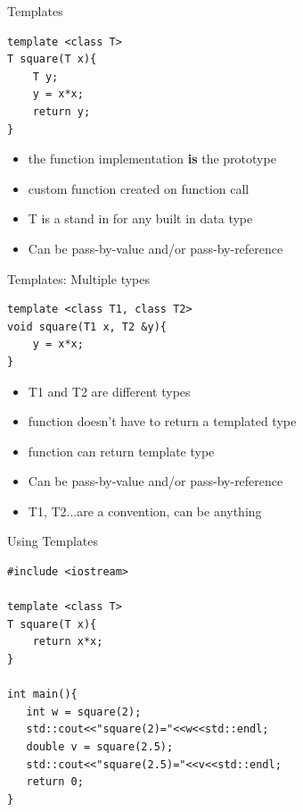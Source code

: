 \documentclass[xcolor={dvipsnames}]{beamer}
\begin{document}
\begin{frame}[fragile]{Templates}
	\begin{center} 
	\begin{verbatim}
template <class T>
T square(T x){
    T y;
    y = x*x;
    return y;
}   
	\end{verbatim}
	\end{center}
	\begin{center}
		\begin{itemize}
			\item the function implementation \textbf{is} the prototype
			\item custom function created on function call
			\item T is a stand in for any built in data type
			\item Can be pass-by-value and/or pass-by-reference	
		\end{itemize}
	\end{center}
\end{frame}

\begin{frame}[fragile]{Templates: Multiple types}
	\begin{center} 
	\begin{verbatim}
template <class T1, class T2>
void square(T1 x, T2 &y){
    y = x*x;
}   
	\end{verbatim}
	\end{center}
	\begin{center}
		\begin{itemize}
			\item T1 and T2 are different types
			\item function doesn't have to return a templated type
			\item function can return template type
			\item Can be pass-by-value and/or pass-by-reference
			\item T1, T2...are a convention, can be anything
		\end{itemize}
	\end{center}
\end{frame}

\begin{frame}[fragile]{Using Templates}
\begin{verbatim}
#include <iostream>

template <class T>
T square(T x){
    return x*x;
}

int main(){
   int w = square(2);
   std::cout<<"square(2)="<<w<<std::endl;
   double v = square(2.5);
   std::cout<<"square(2.5)="<<v<<std::endl;
   return 0;
}
\end{verbatim}
\end{frame}
\end{document}

